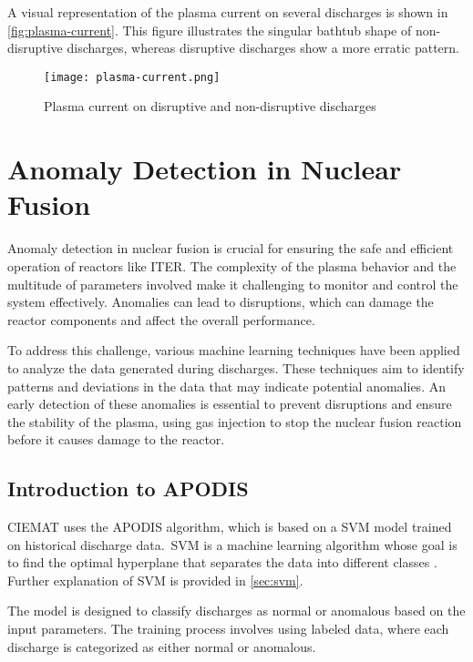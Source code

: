 A visual representation of the plasma current on several discharges is shown in \autoref{fig:plasma-current}. This figure illustrates the singular bathtub shape of non-disruptive discharges, whereas disruptive discharges show a more erratic pattern.

\begin{figure}[H]
    \centering
    \texttt{[image: plasma-current.png]}
    \caption{Plasma current on disruptive and non-disruptive discharges}
    \label{fig:plasma-current}
\end{figure}

\section{Anomaly Detection in Nuclear Fusion}

Anomaly detection in nuclear fusion is crucial for ensuring the safe and efficient operation of reactors like \ac{ITER}. The complexity of the plasma behavior and the multitude of parameters involved make it challenging to monitor and control the system effectively. Anomalies can lead to disruptions, which can damage the reactor components and affect the overall performance.

To address this challenge, various machine learning techniques have been applied to analyze the data generated during discharges. These techniques aim to identify patterns and deviations in the data that may indicate potential anomalies. An early detection of these anomalies is essential to prevent disruptions and ensure the stability of the plasma, using gas injection to stop the nuclear fusion reaction before it causes damage to the reactor.

\subsection{Introduction to \acs{APODIS}}

\ac{CIEMAT} uses the \ac{APODIS} algorithm, which is based on a \ac{SVM} model trained on historical discharge data.\ \ac{SVM} is a machine learning algorithm whose goal is to find the optimal hyperplane that separates the data into different classes \autocite{6524743}. Further explanation of \ac{SVM} is provided in \autoref{sec:svm}.

The model is designed to classify discharges as normal or anomalous based on the input parameters. The training process involves using labeled data, where each discharge is categorized as either normal or anomalous.

